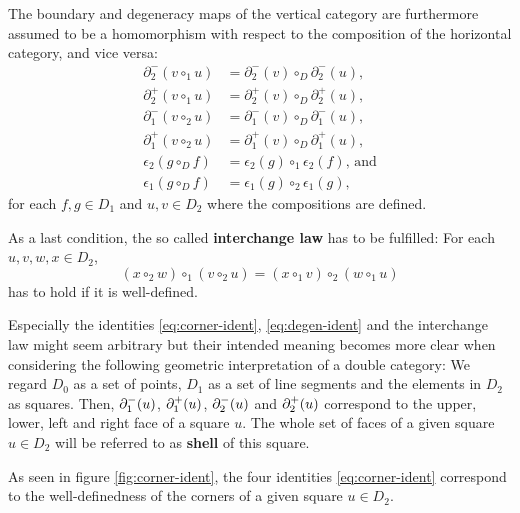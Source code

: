 \begin{defn}
The boundary and degeneracy maps of the vertical category are
furthermore assumed to be a homomorphism with respect to
the composition of the horizontal category, and vice versa:
\begin{equation} \label{eq:linear-ident}
\begin{aligned}
\partial^-_2(v \circ_1 u) &= \partial^-_2(v) \circ_D \partial^-_2(u)\text{,} \\
\partial^+_2(v \circ_1 u) &= \partial^+_2(v) \circ_D \partial^+_2(u)\text{,} \\
\partial^-_1(v \circ_2 u) &= \partial^-_1(v) \circ_D \partial^-_1(u)\text{,} \\
\partial^+_1(v \circ_2 u) &= \partial^+_1(v) \circ_D \partial^+_1(u)\text{,} \\
\epsilon_2(g \circ_D f) &= \epsilon_2(g) \circ_1 \epsilon_2(f)\text{, and} \\
\epsilon_1(g \circ_D f) &= \epsilon_1(g) \circ_2 \epsilon_1(g)\text{,}
\end{aligned}
\end{equation}
for each $f, g \in D_1$ and $u, v \in D_2$ where the compositions are defined.

As a last condition, the so called \textbf{interchange law} has to be fulfilled:
For each $u, v, w, x \in D_2$,
\begin{equation}
(x \circ_2 w) \circ_1 (v \circ_2 u) = (x \circ_1 v) \circ_2 (w \circ_1 u)
\end{equation}
has to hold if it is well-defined.
\end{defn}

Especially the identities \ref{eq:corner-ident}, \ref{eq:degen-ident} and the
interchange law might seem arbitrary but their intended meaning becomes more clear
when considering the following geometric interpretation of a double category: We
regard $D_0$ as a set of points, $D_1$ as a set of line segments and
the elements in $D_2$ as squares. Then, $\partial^-_1(u)$, $\partial^+_1(u)$, $\partial^-_2(u)$ and
$\partial^+_2(u)$ correspond to the upper, lower, left and right face of a square $u$.
The whole set of faces of a given square
$u \in D_2$ will be referred to as \textbf{shell} of this square.

As seen in figure \ref{fig:corner-ident}, the four identities \ref{eq:corner-ident}
correspond to the well-definedness of the corners of a given square $u \in D_2$.

